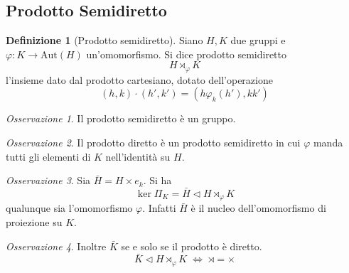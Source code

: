 \documentclass[a4paper]{article}
\theoremstyle{remark}
\newtheorem*{remark}{Osservazione}
\theoremstyle{definition}
\newtheorem{definition}[theorem]{Definizione}
\newcommand{\Aut}[1]{\mathrm{Aut}\left( #1 \right)}
\begin{document}
\subsection{Prodotto Semidiretto}
\begin{multicols}{2}
	\begin{definition}[Prodotto semidiretto]
		Siano $ H, K $ due gruppi e $ \varphi: K \rightarrow \Aut{H} $ un'omomorfismo. Si dice prodotto semidiretto
		\[ H \rtimes_\varphi K \]
		l'insieme dato dal prodotto cartesiano, dotato dell'operazione
		\[ (h, k) \cdot (h', k') = (h \varphi_k(h'), kk') \]
	\end{definition}

\begin{remark}
	Il prodotto semidiretto è un gruppo.
\end{remark}
\begin{remark}
	Il prodotto diretto è un prodotto semidiretto in cui $ \varphi $ manda tutti gli elementi di $ K $ nell'identità su $ H $.
\end{remark}
\begin{remark}
	Sia $ \bar{H} = H \times {e_k} $. Si ha $$  \ker\Pi_K =  \bar{H} \lhd H \rtimes_\varphi K  $$ qualunque sia l'omomorfismo $ \varphi$. Infatti $ \bar{H} $ è il nucleo dell'omomorfismo di proiezione su $ K $.
\end{remark}
\begin{remark}
	Inoltre $ \bar{K}$ se e solo se il prodotto è diretto. $$  \bar{K} \lhd H \rtimes_\varphi K  \;\Leftrightarrow\; \rtimes = \times $$
\end{remark}


\end{multicols}
\end{document}
